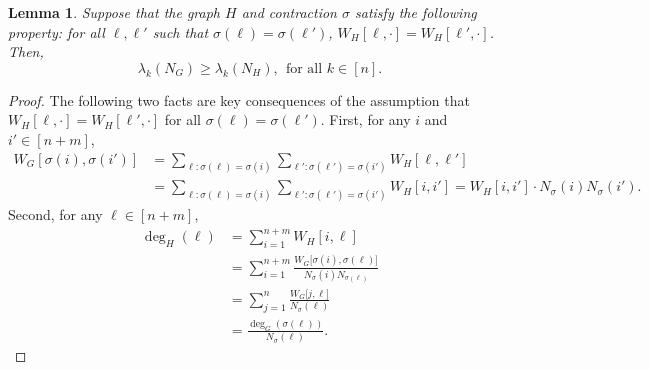\documentclass{article}
\newcommand{\1}{\mathbf{1}}
\theoremstyle{alden}
\theoremstyle{aldenthm}
\newtheorem{lemma}{Lemma}
\theoremstyle{definition}
\theoremstyle{remark}
\begin{document}
\begin{lemma}
	\label{lem:contraction}
	Suppose that the graph $H$ and contraction $\sigma$ satisfy the following property: for all $\ell, \ell'$ such that $\sigma(\ell) = \sigma(\ell')$, $W_H[\ell,\cdot] = W_H[\ell',\cdot]$. Then, 
	\begin{equation*}
	\lambda_k(N_G) \geq \lambda_k(N_{H}),~~\textrm{for all $k \in [n]$.}
	\end{equation*}
\end{lemma}
\begin{proof}
	The following two facts are key consequences of the assumption that $W_H[\ell,\cdot] = W_H[\ell',\cdot]$ for all $\sigma(\ell) = \sigma(\ell')$. First, for any $i$ and $i' \in [n + m]$,
	\begin{align*}
	W_G[\sigma(i),\sigma(i')] & = \sum_{\ell: \sigma(\ell) = \sigma(i)} \sum_{\ell': \sigma(\ell') = \sigma(i')} W_H[\ell,\ell'] \\
	& = \sum_{\ell: \sigma(\ell) = \sigma(i)} \sum_{\ell': \sigma(\ell') = \sigma(i')} W_H[i,i'] = W_H[i,i'] \cdot N_{\sigma}(i) N_{\sigma}(i').
	\end{align*}
	Second, for any $\ell \in [n + m]$,
	\begin{align*}
	\deg_H(\ell) & = \sum_{i = 1}^{n + m} W_H[i,\ell] \\
	& = \sum_{i = 1}^{n + m} \frac{W_G\bigl[\sigma(i),\sigma(\ell)\bigr]}{N_{\sigma}(i) N_{\sigma(\ell)}} \\
	& = \sum_{j = 1}^{n} \frac{W_G\bigl[j,\ell\bigr]}{N_{\sigma}(\ell)} \\
	& = \frac{\deg_G(\sigma(\ell))}{N_{\sigma}(\ell)}.
	\end{align*}
	

\end{proof}
\end{document}
